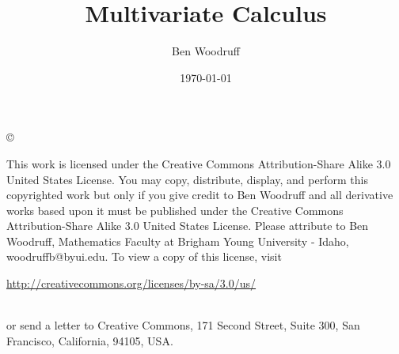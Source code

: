 \documentclass[letterpaper,oneside]{book}%
\theoremstyle{plain}
\theoremstyle{box}
\begin{document}
\frontmatter
\title{Multivariate Calculus}
\author{Ben Woodruff}
\date{\today}
\maketitle
\copyright{This work is licensed under the Creative Commons Attribution-Share Alike 3.0 United States License.  You may copy, distribute, display, and perform this copyrighted work but only if you give credit to Ben Woodruff and all derivative works based upon it must be published under the Creative Commons Attribution-Share Alike 3.0 United States License. Please attribute to Ben Woodruff, Mathematics Faculty at Brigham Young University - Idaho, woodruffb@byui.edu.  To view a copy of this license, visit\\ \centerline{\url{http://creativecommons.org/licenses/by-sa/3.0/us/}} \\ or send a letter to Creative Commons, 171 Second Street, Suite 300, San Francisco, California, 94105, USA.}
\tableofcontents

%

%

\end{document}
